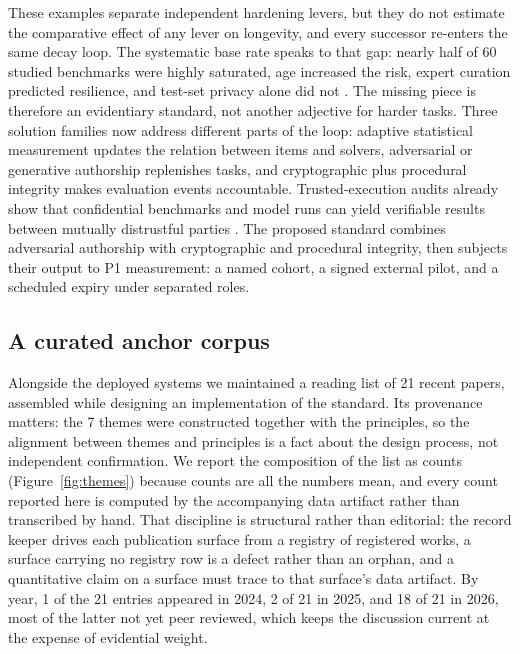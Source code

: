 \documentclass[11pt]{article}
\begin{document}
These examples separate independent hardening levers, but they do not estimate the comparative effect of any lever on longevity, and every successor re-enters the same decay loop. The systematic base rate speaks to that gap: nearly half of 60 studied benchmarks were highly saturated, age increased the risk, expert curation predicted resilience, and test-set privacy alone did not \citep{akhtar2026when}. The missing piece is therefore an evidentiary standard, not another adjective for harder tasks. Three solution families now address different parts of the loop: adaptive statistical measurement updates the relation between items and solvers, adversarial or generative authorship replenishes tasks, and cryptographic plus procedural integrity makes evaluation events accountable. Trusted-execution audits already show that confidential benchmarks and model runs can yield verifiable results between mutually distrustful parties \citep{schnabl2025attestable}. The proposed standard combines adversarial authorship with cryptographic and procedural integrity, then subjects their output to P1 measurement: a named cohort, a signed external pilot, and a scheduled expiry under separated roles.

\subsection{A curated anchor corpus}
\label{sec:corpus}
\label{sec:anchor-corpus}

Alongside the deployed systems we maintained a reading list of 21 recent papers, assembled while designing an implementation of the standard. Its provenance matters: the 7 themes were constructed together with the principles, so the alignment between themes and principles is a fact about the design process, not independent confirmation. We report the composition of the list as counts (Figure~\ref{fig:themes}) because counts are all the numbers mean, and every count reported here is computed by the accompanying data artifact rather than transcribed by hand. That discipline is structural rather than editorial: the record keeper drives each publication surface from a registry of registered works, a surface carrying no registry row is a defect rather than an orphan, and a quantitative claim on a surface must trace to that surface's data artifact. By year, 1 of the 21 entries appeared in 2024, 2 of 21 in 2025, and 18 of 21 in 2026, most of the latter not yet peer reviewed, which keeps the discussion current at the expense of evidential weight.
\end{document}
